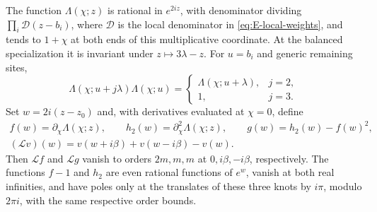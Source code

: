 \begin{lemma}
\label{lem:05-winding-data}
The function \(\Lambda(\chi;z)\) is rational in \(e^{2iz}\), with denominator dividing \(\prod_i\mathscr D(z-b_i)\), where \(\mathscr D\) is the local denominator in \eqref{eq:E-local-weights}, and tends to \(1+\chi\) at both ends of this multiplicative coordinate. At the balanced specialization it is invariant under \(z\mapsto3\lambda-z\). For \(u=b_i\) and generic remaining sites,
\begin{equation}
 \Lambda(\chi;u+j\lambda)\Lambda(\chi;u)
 =\begin{cases}
   \Lambda(\chi;u+\lambda),&j=2,\\
   1,&j=3.
  \end{cases}
 \label{eq:05-annular-pinch}
\end{equation}
Set \(w=2i(z-z_0)\) and, with derivatives evaluated at \(\chi=0\), define
\begin{equation}
 \begin{gathered}
 f(w)=\partial_\chi\Lambda(\chi;z),\qquad
 h_2(w)=\partial_\chi^2\Lambda(\chi;z),\qquad
 g(w)=h_2(w)-f(w)^2,\\
 (\mathscr L v)(w)=v(w+i\beta)+v(w-i\beta)-v(w).
 \end{gathered}
 \label{eq:05-pressure-derivatives}
\end{equation}
Then \(\mathscr L f\) and \(\mathscr L g\) vanish to orders \(2m,m,m\) at \(0,i\beta,-i\beta\), respectively. The functions \(f-1\) and \(h_2\) are even rational functions of \(e^w\), vanish at both real infinities, and have poles only at the translates of these three knots by \(i\pi\), modulo \(2\pi i\), with the same respective order bounds.
\end{lemma}

